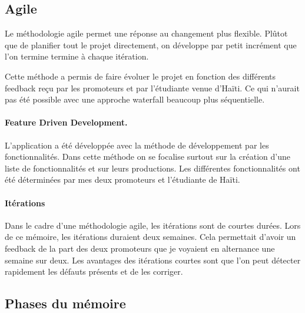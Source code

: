 \documentclass{EPL-master-thesis-covers-FR}
\begin{document}
			\subsection*{Agile}
				Le méthodologie agile permet une réponse au changement plus flexible. Plûtot que de planifier tout le projet directement, on développe par petit incrément que l'on termine termine à chaque itération. 
				
				Cette méthode a permis de faire évoluer le projet en fonction des différents feedback reçu par les promoteurs et par l'étudiante venue d'Haïti. Ce qui n'aurait pas été possible avec une approche waterfall beaucoup plus séquentielle.
				
				\paragraph*{Feature Driven Development.} L'application a été développée avec la méthode de développement par les fonctionnalités. Dans cette méthode on se focalise surtout sur la création d'une liste de fonctionnalités et sur leurs productions. Les différentes fonctionnalités ont été déterminées par mes deux promoteurs et l'étudiante de Haïti.
				
				\paragraph*{Itérations} Dans le cadre d'une méthodologie agile, les itérations sont de courtes durées. Lors de ce mémoire, les itérations duraient deux semaines. Cela permettait d'avoir un feedback de la part des deux promoteurs que je voyaient en alternance une semaine sur deux.
				Les avantages des itérations courtes sont que l'on peut détecter rapidement les défauts présents et de les corriger. 


			\subsection*{Phases du mémoire}
			
\end{document}
